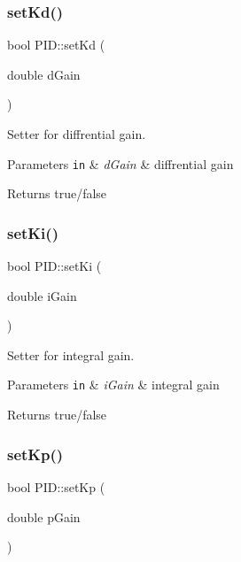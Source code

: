 \subsubsection{\texorpdfstring{set\+Kd()}{setKd()}}
{\footnotesize\ttfamily bool P\+I\+D\+::set\+Kd (\begin{DoxyParamCaption}\item[{double}]{d\+Gain }\end{DoxyParamCaption})}



Setter for diffrential gain. 


\begin{DoxyParams}[1]{Parameters}
\mbox{\tt in}  & {\em d\+Gain} & diffrential gain \\
\hline
\end{DoxyParams}
\begin{DoxyReturn}{Returns}
true/false 
\end{DoxyReturn}
\mbox{\label{classPID_af0d5d19e1657530e1cbca6ed675629e0}} 
\subsubsection{\texorpdfstring{set\+Ki()}{setKi()}}
{\footnotesize\ttfamily bool P\+I\+D\+::set\+Ki (\begin{DoxyParamCaption}\item[{double}]{i\+Gain }\end{DoxyParamCaption})}



Setter for integral gain. 


\begin{DoxyParams}[1]{Parameters}
\mbox{\tt in}  & {\em i\+Gain} & integral gain \\
\hline
\end{DoxyParams}
\begin{DoxyReturn}{Returns}
true/false 
\end{DoxyReturn}
\mbox{\label{classPID_af2a06a6aacd89993347f6adbc906e9a2}} 
\subsubsection{\texorpdfstring{set\+Kp()}{setKp()}}
{\footnotesize\ttfamily bool P\+I\+D\+::set\+Kp (\begin{DoxyParamCaption}\item[{double}]{p\+Gain }\end{DoxyParamCaption})}




